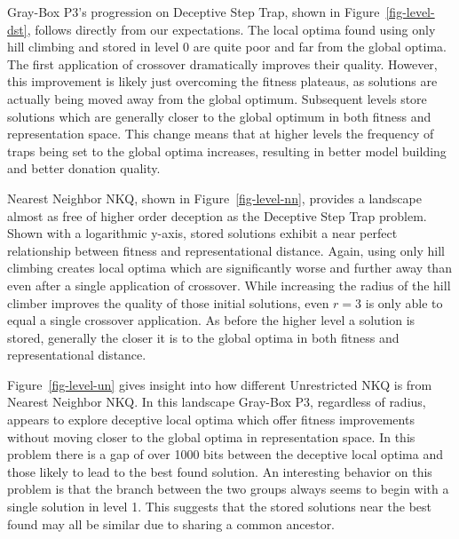 Gray-Box P3's progression on Deceptive Step Trap, shown in Figure~\ref{fig-level-dst}, follows directly from our expectations.
The local optima found using only hill climbing and stored in level 0 are quite poor and far from the global optima.
The first application of crossover dramatically improves their quality. However, this improvement is likely just overcoming
the fitness plateaus, as solutions are actually being moved away from the global optimum. Subsequent levels store solutions
which are generally closer to the global optimum in both fitness and representation space. This change means that at higher
levels the frequency of traps being set to the global optima increases, resulting in better model building and better donation quality.

\begin{figure*}
  \centering
  \caption{Distribution of local optima stored at each level of Gray-Box P3 in relation to the best found by the run on
           a Nearest Neighbor NKQ problem $N=6000$ and $K=4$.}
  \label{fig-level-nn}
\end{figure*}

Nearest Neighbor NKQ, shown in Figure~\ref{fig-level-nn}, provides a landscape almost as free of higher order deception
as the Deceptive Step Trap problem.  Shown with a logarithmic y-axis, stored solutions exhibit a near perfect relationship
between fitness and representational distance. Again, using only hill climbing creates local optima which are significantly
worse and further away than even
after a single application of crossover. While increasing the radius of the hill climber improves the quality of those initial
solutions, even $r=3$ is only able to equal a single crossover application. As before the higher level a solution is stored,
generally the closer it is to the global optima in both fitness and representational distance.

\begin{figure*}
  \centering
  \caption{Distribution of local optima stored at each level of Gray-Box P3 in relation to the best found by the run on
           an Unrestricted NKQ problem $N=6000$ and $K=4$.}
  \label{fig-level-un}
\end{figure*}

Figure~\ref{fig-level-un} gives insight into how different Unrestricted NKQ is from Nearest Neighbor NKQ. In this landscape
Gray-Box P3, regardless of radius, appears to explore deceptive local optima which offer fitness improvements without moving
closer to the global optima in representation space. In this problem there is a gap of over 1000 bits between the deceptive
local optima and those likely to lead to the best found solution. An interesting behavior on this problem is that the branch
between the two groups always seems to begin with a single solution in level 1. This suggests that the stored solutions near
the best found may all be similar due to sharing a common ancestor.

